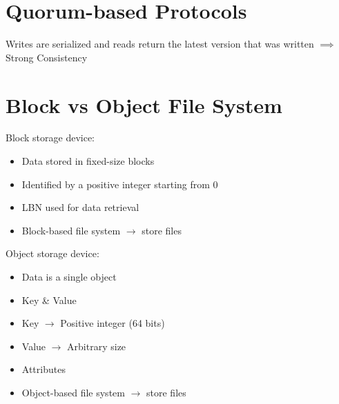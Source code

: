 \section{Quorum-based Protocols}
Writes are serialized and reads return the latest version that was written $\implies$ Strong Consistency

\section{Block vs Object File System}

Block storage device:
  \begin{itemize}
    \item Data stored in fixed-size blocks
    \item Identified by a positive integer starting from 0
    \item LBN used for data retrieval
    \item Block-based file system $\rightarrow$ store files
  \end{itemize}
  Object storage device:
  \begin{itemize}
    \item Data is a single object
      \item Key \& Value
      \item Key $\rightarrow$ Positive integer (64 bits)
      \item Value $\rightarrow$ Arbitrary size
      \item Attributes
    \item Object-based file system $\rightarrow$ store files
  \end{itemize}


